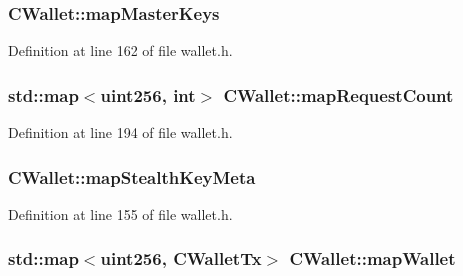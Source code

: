 \hypertarget{class_c_wallet_a23c5badf56c297a95557af3073d4aa32}{}
\subsubsection[{map\+Master\+Keys}]{ C\+Wallet\+::map\+Master\+Keys}\label{class_c_wallet_a23c5badf56c297a95557af3073d4aa32}


Definition at line 162 of file wallet.\+h.

\hypertarget{class_c_wallet_ade5f0fc0e722433b421c32f97bd873a8}{}
\subsubsection[{map\+Request\+Count}]{\setlength{\rightskip}{0pt plus 5cm}std\+::map$<${\bf uint256}, int$>$ C\+Wallet\+::map\+Request\+Count}\label{class_c_wallet_ade5f0fc0e722433b421c32f97bd873a8}


Definition at line 194 of file wallet.\+h.

\hypertarget{class_c_wallet_aeb612f84011f0b02c070c2d39594b9fb}{}
\subsubsection[{map\+Stealth\+Key\+Meta}]{ C\+Wallet\+::map\+Stealth\+Key\+Meta}\label{class_c_wallet_aeb612f84011f0b02c070c2d39594b9fb}


Definition at line 155 of file wallet.\+h.

\hypertarget{class_c_wallet_a0b17f72f2170090f2de43a6c48af3214}{}
\subsubsection[{map\+Wallet}]{\setlength{\rightskip}{0pt plus 5cm}std\+::map$<${\bf uint256}, {\bf C\+Wallet\+Tx}$>$ C\+Wallet\+::map\+Wallet}\label{class_c_wallet_a0b17f72f2170090f2de43a6c48af3214}


